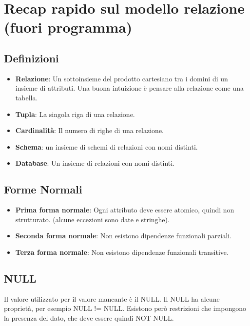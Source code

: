 
\section{Recap rapido sul modello relazione (fuori programma)}
\subsection{Definizioni}
\begin{itemize}
	\item \textbf{Relazione}: Un sottoinsieme del prodotto cartesiano tra i domini di un insieme di attributi. Una buona intuizione è pensare alla relazione come una tabella.
	\item \textbf{Tupla}: La singola riga di una relazione.
	\item \textbf{Cardinalità}: Il numero di righe di una relazione.
	\item \textbf{Schema}: un insieme di schemi di relazioni con nomi distinti.
	\item \textbf{Database}: Un insieme di relazioni con nomi distinti.
\end{itemize}
\subsection{Forme Normali}
\begin{itemize}
	\item \textbf{Prima forma normale}: Ogni attributo deve essere atomico, quindi non strutturato. (alcune eccezioni sono date e stringhe).
	\item \textbf{Seconda forma normale}: Non esistono dipendenze funzionali parziali.
	\item \textbf{Terza forma normale}: Non esistono dipendenze funzionali transitive.
\end{itemize}

\subsection{NULL}
Il valore utilizzato per il valore mancante è il NULL. Il NULL ha alcune proprietà, per esempio NULL != NULL. Esistono però restrizioni che impongono la presenza del dato, che deve essere quindi NOT NULL.


